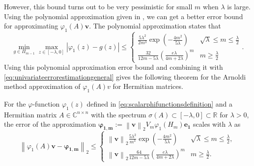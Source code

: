 However, this bound turns out to be very pessimistic for small $m$ when $\lambda$ is large.
Using the polynomial approximation given in \cite[Lemma A.1]{kressner2019krylov},
we can get a better error bound for approximating $\varphi_1(A)\mathbf{v}$.
The polynomial approximation states that
\begin{equation}
    \min_{g \in \Pi_{m-1}} \max_{z \in [-\lambda, 0]} \left|\varphi_1(z) - g(z) \right| \le
    \begin{cases}
        \frac{5\lambda^2}{2m^3} \exp \left( -\frac{4m^2}{5\lambda} \right) & \sqrt{\lambda} \le m \le \frac{\lambda}{2}
        \\
        \frac{32}{12m-5\lambda} \left( \frac{e \lambda}{4m+2\lambda} \right)^m & m \ge \frac{\lambda}{2}
    \end{cases}.
\end{equation}
Using this polynomial approximation error bound and combining it with
\eqref{eq:univariateerrorestimationgeneral} gives the following theorem for the
Arnoldi method approximation of $\varphi_1(A)v$ for Hermitian matrices.
\begin{theorem}
    \label{the:univariateerrorestimationchebyshev}
    For the $\varphi$-function $\varphi_1(z)$ defined in \eqref{eq:scalarphifunctionsdefinition}
    and a Hermitian matrix $A \in \mathbb{C}^{n \times n}$ with the spectrum
    $\sigma(A) \subset [-\lambda, 0] \subset \mathbb{R}$ for $\lambda > 0$,
    the error of the approximation
    $\mathbf{\varphi_{1, m}} := \left\| \mathbf{v} \right\|_{2} V_m \varphi_1(H_m) \mathbf{e_1}$
    scales with $\lambda$ as
    \begin{equation}
        \label{eq:univariateerrorestimationphi1}
        \left\| \varphi_1(A)\mathbf{v} - \mathbf{\varphi_{1, m}} \right\|_2 \le
        \begin{cases}
            \left\| \mathbf{v} \right\|_2 \frac{5\lambda^2}{m^3} \exp \left( -\frac{4m^2}{5\lambda} \right)
            & \sqrt{\lambda} \le m \le \frac{\lambda}{2},
            \\
            \left\| \mathbf{v} \right\|_2 \frac{64}{12m-5\lambda} \left( \frac{e \lambda}{4m+2\lambda} \right)^m
            & m \ge \frac{\lambda}{2}.
        \end{cases}
    \end{equation}
\end{theorem}

